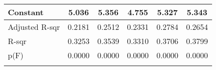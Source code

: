 {\begin{center}
{\begin{longtable}{l*{5}{c}}
            \addlinespace
            Constant                         & 5.036\sym{***}        & 5.356\sym{***}        & 4.755\sym{***}        & 5.327\sym{***}        & 5.343\sym{***}        \\
            \midrule
            Adjusted R-sqr                   & 0.2181                & 0.2512                & 0.2331                & 0.2784                & 0.2654                \\
            R-sqr                            & 0.3253                & 0.3539                & 0.3310                & 0.3706                & 0.3799                \\
            p(F)                             & 0.0000                & 0.0000                & 0.0000                & 0.0000                & 0.0000                \\
            \hline
            \addlinespace
            \multicolumn{6}{l}{\footnotesize \sym{*} \(p<0.10\), \sym{**} \(p<0.05\), \sym{***} \(p<.01\)}                                                           \\
        \end{longtable}
    }
\end{center}
}
